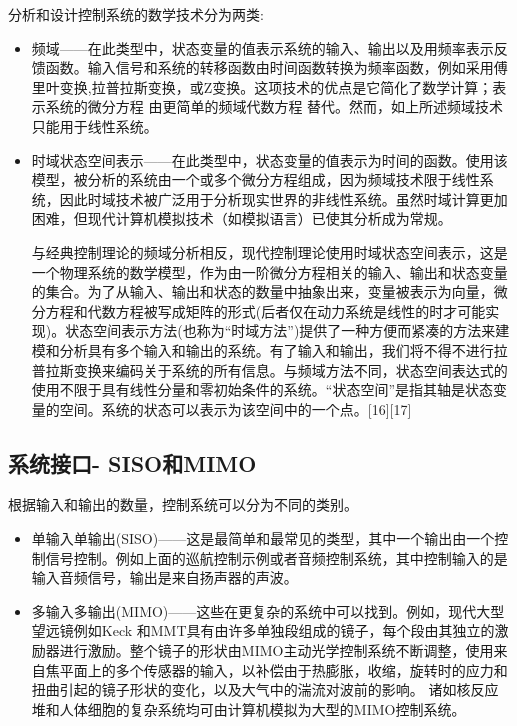 分析和设计控制系统的数学技术分为两类:

\begin{itemize}
\item 频域——在此类型中，状态变量的值表示系统的输入、输出以及用频率表示反馈函数。输入信号和系统的转移函数由时间函数转换为频率函数，例如采用傅里叶变换,拉普拉斯变换，或Z变换。这项技术的优点是它简化了数学计算；表示系统的微分方程 由更简单的频域代数方程 替代。然而，如上所述频域技术只能用于线性系统。
\item 时域状态空间表示——在此类型中，状态变量的值表示为时间的函数。使用该模型，被分析的系统由一个或多个微分方程组成，因为频域技术限于线性系统，因此时域技术被广泛用于分析现实世界的非线性系统。虽然时域计算更加困难，但现代计算机模拟技术（如模拟语言）已使其分析成为常规。

与经典控制理论的频域分析相反，现代控制理论使用时域状态空间表示，这是一个物理系统的数学模型，作为由一阶微分方程相关的输入、输出和状态变量的集合。为了从输入、输出和状态的数量中抽象出来，变量被表示为向量，微分方程和代数方程被写成矩阵的形式(后者仅在动力系统是线性的时才可能实现)。状态空间表示方法(也称为“时域方法”)提供了一种方便而紧凑的方法来建模和分析具有多个输入和输出的系统。有了输入和输出，我们将不得不进行拉普拉斯变换来编码关于系统的所有信息。与频域方法不同，状态空间表达式的使用不限于具有线性分量和零初始条件的系统。“状态空间”是指其轴是状态变量的空间。系统的状态可以表示为该空间中的一个点。[16][17]

\end{itemize}


\subsection{系统接口- SISO和MIMO}

根据输入和输出的数量，控制系统可以分为不同的类别。

\begin{itemize}
\item 单输入单输出(SISO)——这是最简单和最常见的类型，其中一个输出由一个控制信号控制。例如上面的巡航控制示例或者音频控制系统，其中控制输入的是输入音频信号，输出是来自扬声器的声波。
\item 多输入多输出(MIMO)——这些在更复杂的系统中可以找到。例如，现代大型望远镜例如Keck 和MMT具有由许多单独段组成的镜子，每个段由其独立的激励器进行激励。整个镜子的形状由MIMO主动光学控制系统不断调整，使用来自焦平面上的多个传感器的输入，以补偿由于热膨胀，收缩，旋转时的应力和扭曲引起的镜子形状的变化，以及大气中的湍流对波前的影响。 诸如核反应堆和人体细胞的复杂系统均可由计算机模拟为大型的MIMO控制系统。
\end{itemize}

